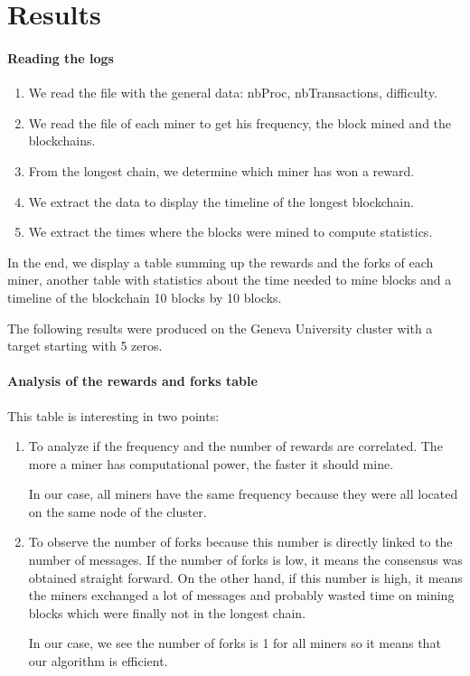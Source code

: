 \section{Results}

\paragraph{Reading the logs}


\begin{enumerate}
  \item We read the file with the general data: nbProc, nbTransactions, difficulty.
  \item We read the file of each miner to get his frequency, the block mined and the blockchains.
  \item From the longest chain, we determine which miner has won a reward.
  \item We extract the data to display the timeline of the longest blockchain.
  \item We extract the times where the blocks were mined to compute statistics.
\end{enumerate}
\medskip

In the end, we display a table summing up the rewards and the forks of each miner, another table with statistics about the time needed to mine blocks and a timeline of the blockchain 10 blocks by 10 blocks. \newline

The following results were produced on the Geneva University cluster with a target starting with 5 zeros.

\paragraph{Analysis of the rewards and forks table}

This table is interesting in two points: \newline

\begin{enumerate}
  \item To analyze if the frequency and the number of rewards are correlated. The more a miner has computational power, the faster it should mine. \newline

  In our case, all miners have the same frequency because they were all located on the same node of the cluster.

  \item To observe the number of forks because this number is directly linked to the number of messages. If the number of forks is low, it means the consensus was obtained straight forward. On the other hand, if this number is high, it means the miners exchanged a lot of messages and probably wasted time on mining blocks which were finally not in the longest chain. \newline

  In our case, we see the number of forks is 1 for all miners so it means that our algorithm is efficient.
\end{enumerate}

